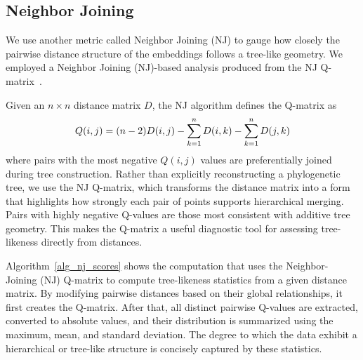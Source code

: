 \documentclass[]{Liebert_Author_revised}
\begin{document}


\subsection{Neighbor Joining}

We use another metric called Neighbor Joining (NJ) to gauge how closely the pairwise distance structure of the embeddings follows a tree-like geometry. We employed a Neighbor Joining (NJ)-based analysis produced from the NJ Q-matrix~\citeauthor{trees1987neighbor}. 

Given an $n \times n$ distance matrix $D$, the NJ algorithm defines the Q-matrix as
\begin{equation}
\scriptsize
Q(i,j) = (n-2)D(i,j) - \sum_{k=1}^{n} D(i,k) - \sum_{k=1}^{n} D(j,k)
\end{equation}
where pairs with the most negative $Q(i,j)$ values are preferentially joined during tree construction. 
Rather than explicitly reconstructing a phylogenetic tree, 
we use the NJ Q-matrix, which transforms the distance matrix into a form that highlights how strongly each pair of points supports hierarchical merging. Pairs with highly negative Q-values are those most consistent with additive tree geometry. This makes the Q-matrix a useful diagnostic tool for assessing tree-likeness directly from distances.

Algorithm~\ref{alg_nj_scores} shows the computation that uses the Neighbor-Joining (NJ) Q-matrix to compute tree-likeness statistics from a given distance matrix. By modifying pairwise distances based on their global relationships, it first creates the Q-matrix. After that, all distinct pairwise Q-values are extracted, converted to absolute values, and their distribution is summarized using the maximum, mean, and standard deviation. The degree to which the data exhibit a hierarchical or tree-like structure is concisely captured by these statistics.
\end{document}
